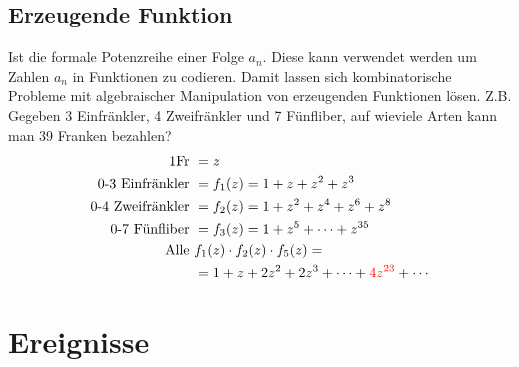 \documentclass[../Main.tex]{subfiles}
\begin{document}
\subsection{Erzeugende Funktion}
Ist die formale Potenzreihe einer Folge \(a_n\). Diese kann verwendet werden um Zahlen \(a_n\) in Funktionen zu codieren. Damit lassen sich kombinatorische Probleme mit algebraischer Manipulation von erzeugenden Funktionen lösen. Z.B. Gegeben 3 Einfränkler, 4 Zweifränkler und 7 Fünfliber, auf wieviele Arten kann man 39 Franken bezahlen?
\begin{equation}
    \begin{split}
        \text{1Fr } &= z \\
        \text{0-3 Einfränkler } &= f_1(z) = 1+z+z^2+z^3\\
        \text{0-4 Zweifränkler } &= f_2(z)=1+z^2+z^4+z^6+z^8\\
        \text{0-7 Fünfliber } &= f_3(z)=1+z^5+\dots +z^{35} \\
        \text{Alle } &f_1(z)\cdot f_2(z) \cdot f_5(z) = \\
        &= 1+z+2z^2+2z^3+\dots+\color{red} 4z^{23} \color{black} +  \cdots
    \end{split}
\end{equation}

\section{Ereignisse}

\end{document}
